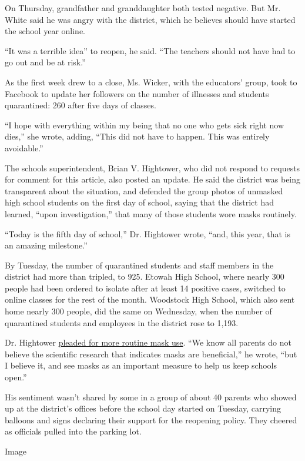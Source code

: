 On Thursday, grandfather and granddaughter both tested negative. But Mr.
White said he was angry with the district, which he believes should have
started the school year online.

``It was a terrible idea'' to reopen, he said. ``The teachers should not
have had to go out and be at risk.''

As the first week drew to a close, Ms. Wicker, with the educators'
group, took to Facebook to update her followers on the number of
illnesses and students quarantined: 260 after five days of classes.

``I hope with everything within my being that no one who gets sick right
now dies,'' she wrote, adding, ``This did not have to happen. This was
entirely avoidable.''

The schools superintendent, Brian V. Hightower, who did not respond to
requests for comment for this article, also posted an update. He said
the district was being transparent about the situation, and defended the
group photos of unmasked high school students on the first day of
school, saying that the district had learned, ``upon investigation,''
that many of those students wore masks routinely.

``Today is the fifth day of school,'' Dr. Hightower wrote, ``and, this
year, that is an amazing milestone.''

By Tuesday, the number of quarantined students and staff members in the
district had more than tripled, to 925. Etowah High School, where nearly
300 people had been ordered to isolate after at least 14 positive cases,
switched to online classes for the rest of the month. Woodstock High
School, which also sent home nearly 300 people, did the same on
Wednesday, when the number of quarantined students and employees in the
district rose to 1,193.

Dr. Hightower
\href{https://www.cherokeek12.net/News/81120message\#sthash.LNefigAz.dpbs}{pleaded
for more routine mask use}. ``We know all parents do not believe the
scientific research that indicates masks are beneficial,'' he wrote,
``but I believe it, and see masks as an important measure to help us
keep schools open.''

His sentiment wasn't shared by some in a group of about 40 parents who
showed up at the district's offices before the school day started on
Tuesday, carrying balloons and signs declaring their support for the
reopening policy. They cheered as officials pulled into the parking lot.

Image

